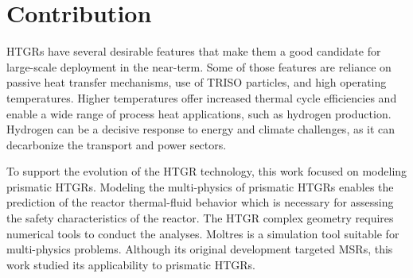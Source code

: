 \section{Contribution}

HTGRs have several desirable features that make them a good candidate for large-scale deployment in the near-term.
Some of those features are reliance on passive heat transfer mechanisms, use of TRISO particles, and high operating temperatures.
Higher temperatures offer increased thermal cycle efficiencies and enable a wide range of process heat applications, such as hydrogen production.
Hydrogen can be a decisive response to energy and climate challenges, as it can decarbonize the transport and power sectors.

To support the evolution of the HTGR technology, this work focused on modeling prismatic HTGRs.
Modeling the multi-physics of prismatic HTGRs enables the prediction of the reactor thermal-fluid behavior which is necessary for assessing the safety characteristics of the reactor.
The HTGR complex geometry requires numerical tools to conduct the analyses.
Moltres is a simulation tool suitable for multi-physics problems.
Although its original development targeted MSRs, this work studied its applicability to prismatic HTGRs.

